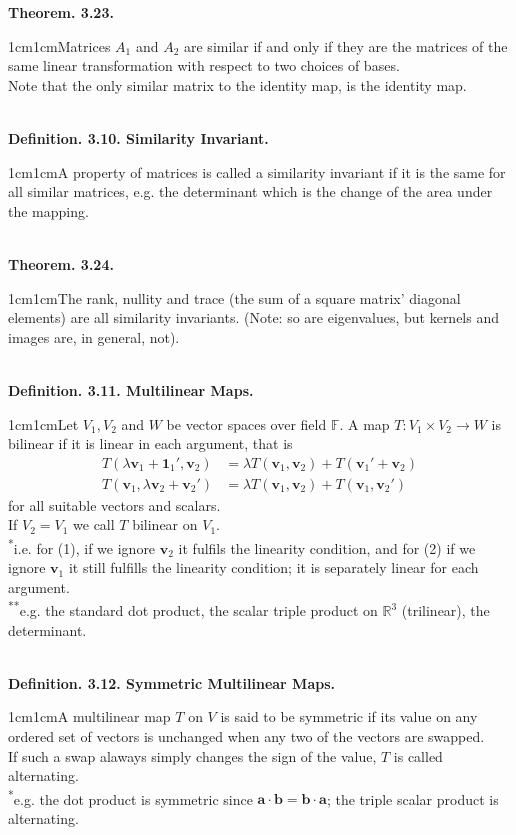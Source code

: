 \documentclass{article}
\newcommand{\vect}[1]{\mathbf{#1}}
\newcommand{\definition}[2]{\textbf{Definition. #1.}\begin{adjustwidth}{1cm}{1cm}#2\end{adjustwidth}}
\newcommand{\theorem}[2]{\textbf{Theorem. #1.}\begin{adjustwidth}{1cm}{1cm}#2\end{adjustwidth}}
\begin{document}
\theorem{3.23}{Matrices $A_1$ and $A_2$ are similar if and only if they are the matrices of the same linear transformation with respect to two choices of bases.\\[1\baselineskip]Note that the only similar matrix to the identity map, is the identity map.}~\\
\definition{3.10. Similarity Invariant}{A property of matrices is called a similarity invariant if it is the same for all similar matrices, e.g. the determinant which is the change of the area under the mapping.}~\\
\theorem{3.24}{The rank, nullity and trace (the sum of a square matrix' diagonal elements) are all similarity invariants. (Note: so are eigenvalues, but kernels and images are, in general, not).}~\\
\definition{3.11. Multilinear Maps}{Let $V_1, V_2$ and $W$ be vector spaces over field $\mathbb{F}$. A map $T: V_1 \times V_2 \rightarrow W$ is bilinear if it is linear in each argument, that is \begin{align} T(\lambda \vect{v}_1 + {\vect{1}_1}', \vect{v}_2) &= \lambda T(\vect{v}_1, \vect{v}_2) + T( {\vect{v}_1}' + \vect{v}_2) \\ T(\vect{v}_1, \lambda \vect{v}_2 + { \vect{v}_2 }') &= \lambda T (\vect{v}_1 , \vect{v}_2 ) + T ( \vect{v}_1, { \vect{v}_2 }') \end{align} for all suitable vectors and scalars.\\If $V_2 = V_1$ we call $T$ bilinear on $V_1$.\\[\baselineskip]\textsuperscript{*}i.e. for (1), if we ignore $\vect{v}_2$ it fulfils the linearity condition, and for (2) if we ignore $\vect{v}_1$ it still fulfills the linearity condition; it is separately linear for each argument.\\[\baselineskip]\textsuperscript{**}e.g. the standard dot product, the scalar triple product on $\mathbb{R}^3$ (trilinear), the determinant.}~\\
\definition{3.12. Symmetric Multilinear Maps}{A multilinear map $T$ on $V$ is said to be symmetric if its value on any ordered set of vectors is unchanged when any two of the vectors are swapped.\\If such a swap alaways simply changes the sign of the value, $T$ is called alternating.\\[1\baselineskip]\textsuperscript{*}e.g. the dot product is symmetric since $\vect{a} \cdot \vect{b} = \vect{b} \cdot \vect{a}$; the triple scalar product is alternating.}
\end{document}
